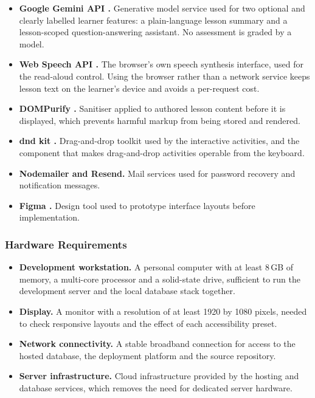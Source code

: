 \documentclass[12pt, oneside]{article} %
\begin{document}
\begin{itemize}
    \item \textbf{Google Gemini API \cite{gemini_api}.} Generative model service used for two optional and clearly labelled learner features: a plain-language lesson summary and a lesson-scoped question-answering assistant. No assessment is graded by a model.
    \item \textbf{Web Speech API \cite{webspeech_api}.} The browser's own speech synthesis interface, used for the read-aloud control. Using the browser rather than a network service keeps lesson text on the learner's device and avoids a per-request cost.
    \item \textbf{DOMPurify \cite{dompurify}.} Sanitiser applied to authored lesson content before it is displayed, which prevents harmful markup from being stored and rendered.
    \item \textbf{dnd kit \cite{dndkit}.} Drag-and-drop toolkit used by the interactive activities, and the component that makes drag-and-drop activities operable from the keyboard.
    \item \textbf{Nodemailer and Resend.} Mail services used for password recovery and notification messages.
    \item \textbf{Figma \cite{figma_software}.} Design tool used to prototype interface layouts before implementation.
\end{itemize}

\subsubsection{Hardware Requirements}

\begin{itemize}
    \item \textbf{Development workstation.} A personal computer with at least 8\,GB of memory, a multi-core processor and a solid-state drive, sufficient to run the development server and the local database stack together.
    \item \textbf{Display.} A monitor with a resolution of at least 1920 by 1080 pixels, needed to check responsive layouts and the effect of each accessibility preset.
    \item \textbf{Network connectivity.} A stable broadband connection for access to the hosted database, the deployment platform and the source repository.
    \item \textbf{Server infrastructure.} Cloud infrastructure provided by the hosting and database services, which removes the need for dedicated server hardware.
\end{itemize}
\end{document}
